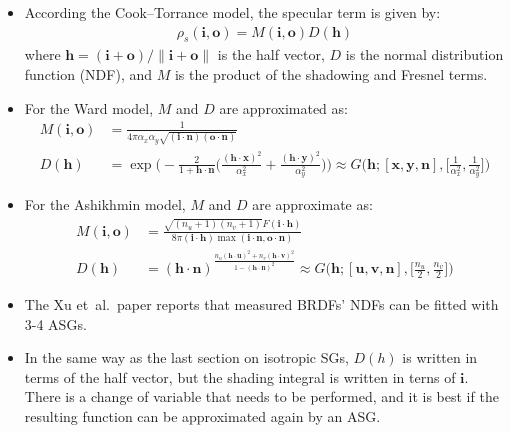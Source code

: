 \documentclass[10pt]{article}
\newcommand{\ve}[1]{\mathbf{#1}}
\newcommand{\etal}{{et~al.}}
\begin{document}
  \begin{itemize}
    \item According the Cook--Torrance model, the specular term is given by:
    \begin{align*}
      \rho_s(\ve{i}, \ve{o}) = M(\ve{i}, \ve{o}) D(\ve{h})
    \end{align*}
    where $\ve{h} = (\ve{i} + \ve{o}) / \| \ve{i} + \ve{o} \|$ is the half vector, $D$ is the normal distribution function (NDF), and $M$ is the product of the shadowing and Fresnel terms.

    \item For the Ward model, $M$ and $D$ are approximated as:
    \begin{align*}
      M(\ve{i}, \ve{o}) 
      &= \frac{1}{4\pi \alpha_x \alpha_y \sqrt{(\ve{i}\cdot\ve{n})(\ve{o}\cdot\ve{n})}} \\
      D(\ve{h})
      &= \exp\bigg( - \frac{2}{1+\ve{h}\cdot\ve{n}}\bigg( \frac{(\ve{h}\cdot\ve{x})^2}{\alpha_x^2} + \frac{(\ve{h}\cdot\ve{y})^2}{\alpha_y^2} \bigg) \bigg)
      \approx G\bigg( \ve{h}; [\ve{x}, \ve{y}, \ve{n}], \Big[\frac{1}{\alpha_x^2}, \frac{1}{\alpha_y^2}\Big] \bigg)
    \end{align*}

    \item For the Ashikhmin model, $M$ and $D$ are approximate as:
    \begin{align*}
      M(\ve{i}, \ve{o})
      &= \frac{\sqrt{(n_u + 1)(n_v + 1)} F(\ve{i} \cdot \ve{h})}{8\pi(\ve{i}\cdot\ve{h}) \max(\ve{i}\cdot\ve{n}, \ve{o}\cdot\ve{n})} \\
      D(\ve{h}) 
      &= (\ve{h} \cdot \ve{n})^{\frac{n_u(\ve{h}\cdot\ve{u})^2 + n_v(\ve{h}\cdot\ve{v})^2}{1 - (\ve{h}\cdot\ve{n})^2}}
      \approx G\bigg(\ve{h}; [\ve{u},\ve{v},\ve{n}], \Big[ \frac{n_u}{2}, \frac{n_v}{2} \Big]\bigg)
    \end{align*}

    \item The Xu \etal\ paper reports that measured BRDFs' NDFs can be fitted with 3-4 ASGs.

    \item In the same way as the last section on isotropic SGs, $D(h)$ is written in terms of the half vector, but the shading integral is written in terns of $\ve{i}$.  There is a change of variable that needs to be performed, and it is best if the resulting function can be approximated again by an ASG.


\end{itemize}
\end{document}
